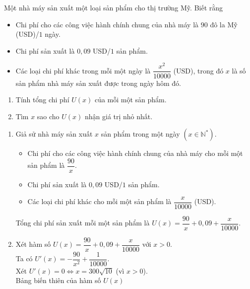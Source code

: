 \begin{bt}%
	Một nhà máy sản xuất một loại sản phẩm cho thị trường Mỹ. Biết rằng
	\begin{itemize}
		\item Chi phí cho các công việc hành chính chung của nhà máy là $90$ đô la Mỹ (USD)/$1$ ngày.
		\item Chi phí sản xuất là $0{,}09$ USD/$1$ sản phẩm.
		\item Các loại chi phí khác trong mỗi một ngày là $\dfrac{x^2}{10000}$ (USD), trong đó $x$ là số sản phẩm nhà máy sản xuất được trong ngày hôm đó.
	\end{itemize}
	\begin{enumerate}
		\item Tính tổng chi phí $U(x)$ của mỗi một sản phẩm.
		\item Tìm $x$ sao cho $U(x)$ nhận giá trị nhỏ nhất.
	\end{enumerate}
	\loigiai
	{
		\begin{enumerate}
			\item
			Giả sử nhà máy sản xuất $x$ sản phẩm trong một ngày $\left(x\in\mathbb{N}^{\ast}\right)$.
			\begin{itemize}
				\item Chi phí cho các công việc hành chính chung của nhà máy cho mỗi một sản phẩm là $\dfrac{90}{x}$.
				\item Chi phí sản xuất là $0{,}09$ USD/$1$ sản phẩm.
				\item Các loại chi phí khác cho mỗi một sản phẩm là $\dfrac{x}{10000}$ (USD).
			\end{itemize}
			Tổng chi phí sản xuất mỗi một sản phẩm là $U(x)=\dfrac{90}{x}+0{,}09+\dfrac{x}{10000}$.
			\item
			Xét hàm số $U(x)=\dfrac{90}{x}+0{,}09+\dfrac{x}{10000}$ với $x>0$. \\
			Ta có $U'(x)=-\dfrac{90}{x^2}+\dfrac{1}{10000}$. \\
			Xét $U'(x)=0 \Leftrightarrow x=300\sqrt{10}$ (vì $x>0$). \\
			Bảng biến thiên của hàm số $U(x)$
			\begin{center}
\end{center}
\end{enumerate}}
\end{bt}
